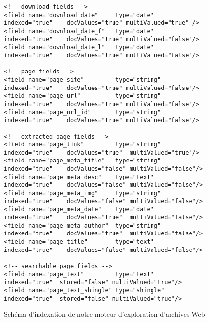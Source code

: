 \documentclass[symmetric,justified,marginals=raggedouter]{tufte-book}
\begin{document}
\newpage
\begin{figure*}
\begin{fullwidth}
\small
\begin{verbatim}
<!-- download fields -->
<field name="download_date"     type="date"    indexed="true"    docValues="true" multiValued="true" />
<field name="download_date_f"   type="date"    indexed="true"    docValues="true" multiValued="false"/>
<field name="download_date_l"   type="date"    indexed="true"    docValues="true" multiValued="false"/> 

<!-- page fields -->
<field name="page_site"         type="string"  indexed="true"    docValues="true" multiValued="false"/>
<field name="page_url"          type="string"  indexed="true"    docValues="true" multiValued="false"/>
<field name="page_url_id"       type="string"  indexed="true"    docValues="true" multiValued="false"/>      

<!-- extracted page fields -->
<field name="page_link"         type="string"  indexed="true"    docValues="true"  multiValued="true"/>     
<field name="page_meta_title"   type="string"  indexed="true"    docValues="false" multiValued="false"/>
<field name="page_meta_desc"    type="text"    indexed="true"    docValues="false" multiValued="false"/>
<field name="page_meta_img"     type="string"  indexed="true"    docValues="false" multiValued="false"/>
<field name="page_meta_date"    type="date"    indexed="true"    docValues="true"  multiValued="false"/>    
<field name="page_meta_author"  type="string"  indexed="true"    docValues="true"  multiValued="false"/>    
<field name="page_title"        type="text"    indexed="true"    docValues="false" multiValued="false"/>

<!-- searchable page fields -->
<field name="page_text"         type="text"    indexed="true"  stored="false" multiValued="true"/>
<field name="page_text_shingle" type="shingle" indexed="true"  stored="false" multiValued="true"/> 
\end{verbatim} 
\end{fullwidth}
\caption{Schéma d'indexation de notre moteur d'exploration d'archives Web}
\label{fig:schema_1}
\end{figure*}
\end{document}
